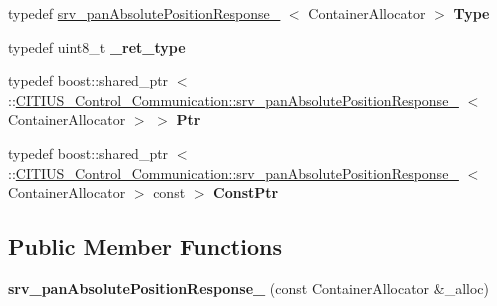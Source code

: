 \begin{DoxyCompactItemize}
\item 
\hypertarget{struct_c_i_t_i_u_s___control___communication_1_1srv__pan_absolute_position_response___a00d123ff0c5fa5a11e0d3ba55998c7dd}{typedef \*
\hyperlink{struct_c_i_t_i_u_s___control___communication_1_1srv__pan_absolute_position_response__}{srv\-\_\-pan\-Absolute\-Position\-Response\-\_\-}\*
$<$ \-Container\-Allocator $>$ {\bfseries \-Type}}\label{struct_c_i_t_i_u_s___control___communication_1_1srv__pan_absolute_position_response___a00d123ff0c5fa5a11e0d3ba55998c7dd}

\item 
\hypertarget{struct_c_i_t_i_u_s___control___communication_1_1srv__pan_absolute_position_response___abc11e05fd500b8ea16200e635a4570ac}{typedef uint8\-\_\-t {\bfseries \-\_\-ret\-\_\-type}}\label{struct_c_i_t_i_u_s___control___communication_1_1srv__pan_absolute_position_response___abc11e05fd500b8ea16200e635a4570ac}

\item 
\hypertarget{struct_c_i_t_i_u_s___control___communication_1_1srv__pan_absolute_position_response___abb6614f955b0a686345709b2d8f7a127}{typedef boost\-::shared\-\_\-ptr\*
$<$ \-::\hyperlink{struct_c_i_t_i_u_s___control___communication_1_1srv__pan_absolute_position_response__}{\-C\-I\-T\-I\-U\-S\-\_\-\-Control\-\_\-\-Communication\-::srv\-\_\-pan\-Absolute\-Position\-Response\-\_\-}\*
$<$ \-Container\-Allocator $>$ $>$ {\bfseries \-Ptr}}\label{struct_c_i_t_i_u_s___control___communication_1_1srv__pan_absolute_position_response___abb6614f955b0a686345709b2d8f7a127}

\item 
\hypertarget{struct_c_i_t_i_u_s___control___communication_1_1srv__pan_absolute_position_response___a1218bd754ed85dbba2cea86c0157d90c}{typedef boost\-::shared\-\_\-ptr\*
$<$ \-::\hyperlink{struct_c_i_t_i_u_s___control___communication_1_1srv__pan_absolute_position_response__}{\-C\-I\-T\-I\-U\-S\-\_\-\-Control\-\_\-\-Communication\-::srv\-\_\-pan\-Absolute\-Position\-Response\-\_\-}\*
$<$ \-Container\-Allocator $>$ const  $>$ {\bfseries \-Const\-Ptr}}\label{struct_c_i_t_i_u_s___control___communication_1_1srv__pan_absolute_position_response___a1218bd754ed85dbba2cea86c0157d90c}

\end{DoxyCompactItemize}
\subsection*{\-Public \-Member \-Functions}
\begin{DoxyCompactItemize}
\item 
\hypertarget{struct_c_i_t_i_u_s___control___communication_1_1srv__pan_absolute_position_response___a7faf0d2b8be1f7a5ab02aac0cec1fbbc}{{\bfseries srv\-\_\-pan\-Absolute\-Position\-Response\-\_\-} (const \-Container\-Allocator \&\-\_\-alloc)}\label{struct_c_i_t_i_u_s___control___communication_1_1srv__pan_absolute_position_response___a7faf0d2b8be1f7a5ab02aac0cec1fbbc}

\end{DoxyCompactItemize}
